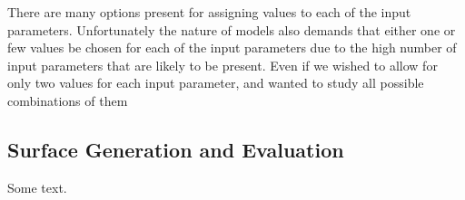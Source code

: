 There are many options present for assigning values to each of the input parameters. Unfortunately the nature of models also demands that either one or few values be chosen for each of the input parameters due to the high number of input parameters that are likely to be present. Even if we wished to allow for only two values for each input parameter, and wanted to study all possible combinations of them

\subsection{Surface Generation and Evaluation\label{sec:surf_usage}}
Some text.



%
%
%
%
%
%
%
%
%
